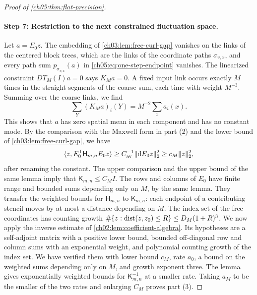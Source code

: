\begin{proof}[Proof of \cref{ch05:thm:flat-precision}]
\paragraph{Step 7: Restriction to the next constrained fluctuation space.}
Let $a=E_0z$. The embedding of \cref{ch03:lem:free-curl-gap} vanishes on the links of the centered block trees, which are the links of the coordinate paths $\sigma_{v,x}$, and every path sum $p_{\sigma_{v,x}}(a)$ in \eqref{ch05:eq:one-step-endpoint} vanishes. The linearized constraint $DT_M(I)a=0$ says $K_Ma=0$. A fixed input link occurs exactly $M$ times in the straight segments of the coarse sum, each time with weight $M^{-3}$. Summing over the coarse links, we find
\[
 \sum_Y(K_Ma)_i(Y)=M^{-2}\sum_xa_i(x).
\]
This shows that $a$ has zero spatial mean in each component and has no constant mode. By the comparison with the Maxwell form in part (2) and the lower bound of \cref{ch03:lem:free-curl-gap}, we have
\[
 \langle z,E_0^{\mathsf T}\mathsf H_{m,n}E_0z\rangle\ge C_{\mathrm{av}}^{-1}\lVert \mathrm dE_0z\rVert_2^2\ge c_M\lVert z\rVert_2^2,
\]
after renaming the constant. The upper comparison and the upper bound of the same lemma imply that $\mathsf K_{m,n}\le C_MI$. The rows and columns of $E_0$ have finite range and bounded sums depending only on $M$, by the same lemma. They transfer the weighted bounds for $\mathsf H_{m,n}$ to $\mathsf K_{m,n}$: each endpoint of a contributing stencil moves by at most a distance depending on $M$. The index set of the free coordinates has counting growth $\#\{z:\operatorname{dist}(z,z_0)\le R\}\le D_M(1+R)^3$. We now apply the inverse estimate of \cref{ch02:lem:coefficient-algebra}. Its hypotheses are a self-adjoint matrix with a positive lower bound, bounded off-diagonal row and column sums with an exponential weight, and polynomial counting growth of the index set. We have verified them with lower bound $c_M$, rate $a_0$, a bound on the weighted sums depending only on $M$, and growth exponent three. The lemma gives exponentially weighted bounds for $\mathsf K_{m,n}^{-1}$ at a smaller rate. Taking $a_M$ to be the smaller of the two rates and enlarging $C_M$ proves part (3).


\end{proof}
